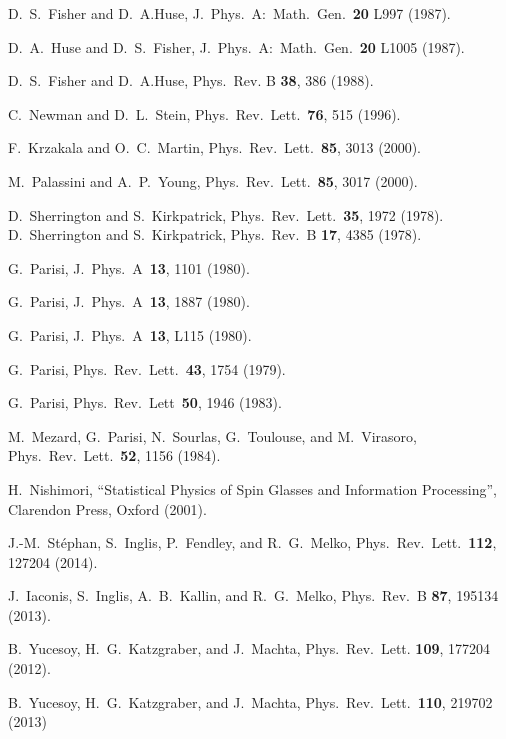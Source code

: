 \documentclass[twocolumn,superscriptaddress,prb,10pt]{revtex4-1}
\begin{document}
\begin{thebibliography}{99}
D.~S.~Fisher and D.~A.Huse, J.\ Phys.\ A:\ Math.\ Gen.\ {\bf 20} L997 (1987).

D.~A.~Huse and D.~S.~Fisher, J.\ Phys.\ A:\ Math.\ Gen.\ {\bf 20} L1005 (1987).

D.~S.~Fisher and D.~A.Huse, Phys.\ Rev. B {\bf 38}, 386 (1988).

C.~Newman and D.~L.~Stein, Phys.\ Rev.\ Lett.\ {\bf 76}, 515 (1996).

F.~Krzakala and O.~C.~Martin, Phys.\ Rev.\ Lett.\ {\bf 85}, 3013 (2000).

M.~Palassini and A.~P.~Young, Phys.\ Rev.\ Lett.\  {\bf 85}, 3017 (2000).

D.~Sherrington and S.~Kirkpatrick, Phys.\ Rev.\ Lett.\ {\bf 35}, 
1972 (1978).
D.~Sherrington and S.~Kirkpatrick, Phys.\ Rev.\ B {\bf 17}, 4385 
(1978).

G.~Parisi, J.\ Phys.\ A\ {\bf 13}, 1101 (1980). 

G.~Parisi, J.\ Phys.\ A\ {\bf 13}, 1887 (1980). 

G.~Parisi, J.\ Phys.\ A\ {\bf 13}, L115 (1980). 

G.~Parisi, Phys.\ Rev.\ Lett.\ {\bf 43}, 1754 (1979).

G.~Parisi, Phys.\ Rev.\ Lett\ {\bf 50}, 1946 (1983). 

M.~Mezard, G.~Parisi, N.~Sourlas, G.~Toulouse, and M.~Virasoro, 
Phys.\ Rev.\ Lett.\ {\bf 52}, 1156 (1984). 

H.~Nishimori, ``Statistical Physics of Spin Glasses and Information Processing'', 
Clarendon Press, Oxford (2001).

J.-M.~St\'ephan, S.~Inglis, P.~Fendley, and R.~G.~Melko, 
Phys.\ Rev.\ Lett.\ {\bf 112}, 127204 (2014).

J.~Iaconis, S.~Inglis, A.~B.~Kallin, and R.~G.~Melko, 
Phys.\ Rev.\ B {\bf 87}, 195134 (2013).

B.~Yucesoy, H.~G.~Katzgraber, and J.~Machta, Phys.\ Rev.\ Lett. {\bf 109}, 
177204 (2012).

B.~Yucesoy, H.~G.~Katzgraber, and J.~Machta, Phys.\ Rev.\ Lett.\ {\bf 110}, 
219702 (2013)


\end{thebibliography}
\end{document}
